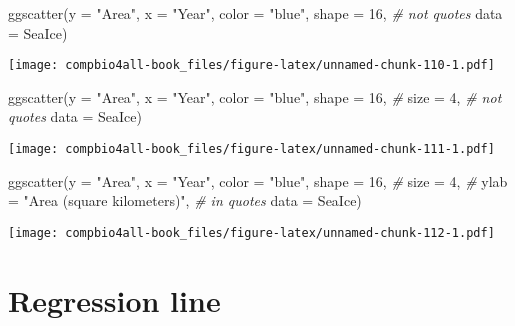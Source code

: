 \documentclass[
]{book}
\newenvironment{Shaded}{\begin{snugshade}}{\end{snugshade}}
\newcommand{\AttributeTok}[1]{\textcolor[rgb]{0.77,0.63,0.00}{#1}}
\newcommand{\CommentTok}[1]{\textcolor[rgb]{0.56,0.35,0.01}{\textit{#1}}}
\newcommand{\DecValTok}[1]{\textcolor[rgb]{0.00,0.00,0.81}{#1}}
\newcommand{\FunctionTok}[1]{\textcolor[rgb]{0.00,0.00,0.00}{#1}}
\newcommand{\NormalTok}[1]{#1}
\newcommand{\StringTok}[1]{\textcolor[rgb]{0.31,0.60,0.02}{#1}}
\begin{document}
\begin{Shaded}
\begin{Highlighting}[]
\FunctionTok{ggscatter}\NormalTok{(}\AttributeTok{y =} \StringTok{"Area"}\NormalTok{,}
          \AttributeTok{x =} \StringTok{"Year"}\NormalTok{,}
          \AttributeTok{color =} \StringTok{"blue"}\NormalTok{,}
          \AttributeTok{shape =} \DecValTok{16}\NormalTok{,     }\CommentTok{\# not quotes}
          \AttributeTok{data =}\NormalTok{ SeaIce)}
\end{Highlighting}
\end{Shaded}

\texttt{[image: compbio4all-book\_files/figure-latex/unnamed-chunk-110-1.pdf]}

\begin{Shaded}
\begin{Highlighting}[]
\FunctionTok{ggscatter}\NormalTok{(}\AttributeTok{y =} \StringTok{"Area"}\NormalTok{,}
          \AttributeTok{x =} \StringTok{"Year"}\NormalTok{,}
          \AttributeTok{color =} \StringTok{"blue"}\NormalTok{,}
          \AttributeTok{shape =} \DecValTok{16}\NormalTok{,     }\CommentTok{\# }
          \AttributeTok{size =} \DecValTok{4}\NormalTok{,       }\CommentTok{\# not quotes}
          \AttributeTok{data =}\NormalTok{ SeaIce)}
\end{Highlighting}
\end{Shaded}

\texttt{[image: compbio4all-book\_files/figure-latex/unnamed-chunk-111-1.pdf]}

\begin{Shaded}
\begin{Highlighting}[]
\FunctionTok{ggscatter}\NormalTok{(}\AttributeTok{y =} \StringTok{"Area"}\NormalTok{,}
          \AttributeTok{x =} \StringTok{"Year"}\NormalTok{,}
          \AttributeTok{color =} \StringTok{"blue"}\NormalTok{,}
          \AttributeTok{shape =} \DecValTok{16}\NormalTok{,     }\CommentTok{\# }
          \AttributeTok{size =} \DecValTok{4}\NormalTok{,       }\CommentTok{\# }
          \AttributeTok{ylab =} \StringTok{"Area (square kilometers)"}\NormalTok{, }\CommentTok{\# in quotes}
          \AttributeTok{data =}\NormalTok{ SeaIce)}
\end{Highlighting}
\end{Shaded}

\texttt{[image: compbio4all-book\_files/figure-latex/unnamed-chunk-112-1.pdf]}

\hypertarget{regression-line}{%
\section{Regression line}\label{regression-line}}
\end{document}
